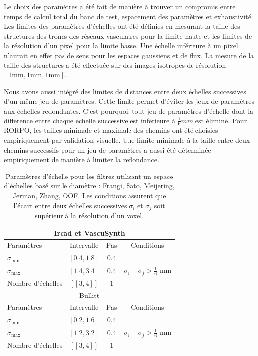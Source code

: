 Le choix des paramètres a été fait de manière à trouver un compromis entre temps de calcul total du banc de test, espacement des paramètres et exhaustivité. Les limites des paramètres d'échelles ont été définies en mesurant la taille des structures des troncs des réseaux vasculaires pour la limite haute et les limites de la résolution d'un pixel pour la limite basse. Une échelle inférieure à un pixel n'aurait en effet pas de sens pour les espaces gaussiens et de flux. La mesure de la taille des structures a été effectuée sur des images isotropes de résolution $[1\textrm{mm},1\textrm{mm},1\textrm{mm}]$. 

Nous avons aussi intégré des limites de distances entre deux échelles successives d'un même jeu de paramètres. Cette limite permet d'éviter les jeux de paramètres aux échelles redondantes. C'est pourquoi, tout jeu de paramètres d'échelle dont la différence entre chaque échelle successive est inférieure à $\frac{1}{6} mm$ est éliminé. Pour RORPO, les tailles minimale et maximale des chemins ont été choisies empiriquement par validation visuelle. Une limite minimale à la taille entre deux chemins successifs pour un jeu de paramètres a aussi été déterminée empiriquement de manière à limiter la redondance.

 \begin{table}[H]
  \caption{Paramètres d'échelle pour les filtres utilisant un espace d'échelles basé sur le diamètre :  Frangi, Sato, Meijering, Jerman, Zhang, OOF. Les conditions  assurent que l'écart entre deux échelles successives $\sigma_i$ et $\sigma_j$ soit supérieur à la résolution d'un voxel.}
  \label{tab:SS_interval}
  \begin{center}
    \begin{tabular}{  l  c  c  c }
      \hline
      \multicolumn{4}{c}{ Ircad et VascuSynth }\\
      \hline
      Paramètres & Intervalle & Pas & Conditions \\
      \hline
      $\sigma_{\min}$ & $[0.4,1.8]$ & $0.4$ & \\
      $\sigma_{\max}$ & $[1.4,3.4]$  & $0.4$ & $\sigma_{i} - \sigma_{j} > \frac{1}{6}$ mm \\ 
      Nombre d'échelles & $[\![3,4]\!]$ & $1$ & \\
      \hline
      \hline
      \multicolumn{4}{c}{ Bullitt }\\
      \hline
      Paramètres & Intervalle & Pas & Conditions \\
      \hline
      $\sigma_{\min}$ & $[0.2,1.6]$ & $0.4$ & \\
      $\sigma_{\max}$ & $[1.2,3.2]$  & $0.4$ & $\sigma_{i} - \sigma_{j} > \frac{1}{6}$ mm \\ 
      Nombre d'échelles & $[\![3,4]\!]$ & $1$ & \\
      \hline
    \end{tabular}
  \end{center}
\end{table}

